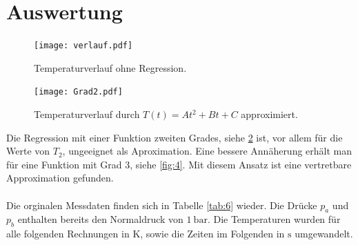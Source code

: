 \section{Auswertung}
\begin{figure}
  \centering
  \texttt{[image: verlauf.pdf]}
  \caption{Temperaturverlauf ohne Regression.}
  \label{fig:5}
\end{figure}
\label{sec:Auswertung}
\begin{figure}
  \centering
  \texttt{[image: Grad2.pdf]}
  \caption{Temperaturverlauf durch $T(t) = At^2 + Bt + C$ approximiert.}
  \label{fig:3}
\end{figure}
Die Regression mit einer Funktion zweiten Grades, siehe \ref{fig:3} ist, vor
allem für die Werte von $T_2$, ungeeignet als Aproximation.
Eine bessere Annäherung erhält man für eine Funktion mit Grad 3, siehe \ref{fig:4}.
Mit diesem Ansatz ist eine vertretbare Approximation gefunden.
\\
\\
Die orginalen Messdaten finden sich in Tabelle \ref{tab:6} wieder. Die Drücke
$p_a$ und $p_b$ enthalten bereits den Normaldruck von $\SI{1}{\bar}$. Die Temperaturen
wurden für alle folgenden Rechnungen in $\si{\kelvin}$, sowie die Zeiten
im Folgenden in $\si{\second}$ umgewandelt.
